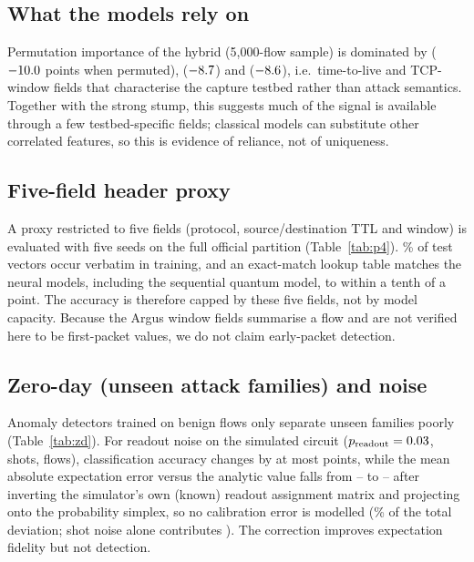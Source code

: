 \IfFileExists{IEEEtran.cls}{\documentclass[conference]{IEEEtran}}{\documentclass[10pt,twocolumn]{article}\usepackage[margin=0.8in]{geometry}}
\newcommand{\fit}[1]{\resizebox{\ifdim\width>\columnwidth\columnwidth\else\width\fi}{!}{#1}}
\begin{document}
\begin{table}[t]\centering\caption{Circuit ablation on the primary protocol.}\label{tab:abl}\small
\fit{}\end{table}
\begin{table}[t]\centering\caption{Circuit ablation, 5{,}000-flow sample, 30 re-splits.}\label{tab:s30}\small
\fit{}\end{table}

\subsection{What the models rely on}
Permutation importance of the hybrid (5{,}000-flow sample) is dominated by \texttt{\permFeatOne} ($-10.0$ points when permuted), \texttt{\permFeatTwo} ($-8.7$) and \texttt{\permFeatThree} ($-8.6$), i.e.\ time-to-live and TCP-window fields that characterise the capture testbed rather than attack semantics. Together with the strong stump, this suggests much of the signal is available through a few testbed-specific fields; classical models can substitute other correlated features, so this is evidence of reliance, not of uniqueness.

\subsection{Five-field header proxy}
A proxy restricted to five fields (protocol, source/destination TTL and window) is evaluated with five seeds on the full official partition (Table~\ref{tab:p4}). \pFourSeenPct\% of test vectors occur verbatim in training, and an exact-match lookup table matches the neural models, including the sequential quantum model, to within a tenth of a point. The accuracy is therefore capped by these five fields, not by model capacity. Because the Argus window fields summarise a flow and are not verified here to be first-packet values, we do not claim early-packet detection.

\begin{table}[t]\centering\caption{Five-field header proxy, official partition.}\label{tab:p4}\small\fit{}\end{table}

\subsection{Zero-day (unseen attack families) and noise}
Anomaly detectors trained on benign flows only separate unseen families poorly (Table~\ref{tab:zd}). For readout noise on the simulated circuit ($p_{\text{readout}}=0.03$, \noiseShots{} shots, \noiseSamples{} flows), classification accuracy changes by at most \noiseAccDelta{} points, while the mean absolute expectation error versus the analytic value falls from \maeNoisyLo--\maeNoisyHi{} to \maeMitLo--\maeMitHi{} after inverting the simulator's own (known) readout assignment matrix and projecting onto the probability simplex, so no calibration error is modelled (\mitRecoveryPct\% of the total deviation; shot noise alone contributes \maeShot{}). The correction improves expectation fidelity but not detection.
\end{document}
